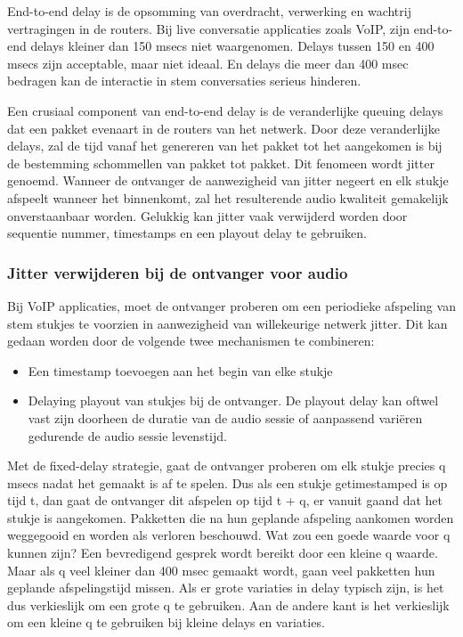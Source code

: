 
End-to-end delay is de opsomming van overdracht, verwerking en wachtrij vertragingen in de routers. Bij live conversatie applicaties zoals VoIP, zijn end-to-end delays kleiner dan 150 msecs niet waargenomen. Delays tussen 150 en 400 msecs zijn acceptable, maar niet ideaal. En delays die meer dan 400 msec bedragen kan de interactie in stem conversaties serieus hinderen.

\clearpage


Een crusiaal component van end-to-end delay is de veranderlijke queuing delays dat een pakket evenaart in de routers van het netwerk. Door deze veranderlijke delays, zal de tijd vanaf het genereren van het pakket tot het aangekomen is bij de bestemming schommellen van pakket tot pakket. Dit fenomeen wordt jitter genoemd. Wanneer de ontvanger de aanwezigheid van jitter negeert en elk stukje afspeelt wanneer het binnenkomt, zal het resulterende audio kwaliteit gemakelijk onverstaanbaar worden. Gelukkig kan jitter vaak verwijderd worden door sequentie nummer, timestamps en een playout delay te gebruiken.

\subsubsection{Jitter verwijderen bij de ontvanger voor audio}

Bij VoIP applicaties, moet de ontvanger proberen om een periodieke afspeling van stem stukjes te voorzien in aanwezigheid van willekeurige netwerk jitter. Dit kan gedaan worden door de volgende twee mechanismen te combineren:
\begin{itemize}
\item Een timestamp toevoegen aan het begin van elke stukje
\item Delaying playout van stukjes bij de ontvanger. De playout delay kan oftwel vast zijn doorheen de duratie van de audio sessie of aanpassend variëren gedurende de audio sessie levenstijd.
\end{itemize}


Met de fixed-delay strategie, gaat de ontvanger proberen om elk stukje precies q msecs nadat het gemaakt is af te spelen. Dus als een stukje getimestamped is op tijd t, dan gaat de ontvanger dit afspelen op tijd t + q, er vanuit gaand dat het stukje is aangekomen. Pakketten die na hun geplande afspeling aankomen worden weggegooid en worden als verloren beschouwd.
Wat zou een goede waarde voor q kunnen zijn? Een bevredigend gesprek wordt bereikt door een kleine q waarde. Maar als q veel kleiner dan 400 msec gemaakt wordt, gaan veel pakketten hun geplande afspelingstijd missen. Als er grote variaties in delay typisch zijn, is het dus verkieslijk om een grote q te gebruiken. Aan de andere kant is het verkieslijk om een kleine q te gebruiken bij kleine delays en variaties.

